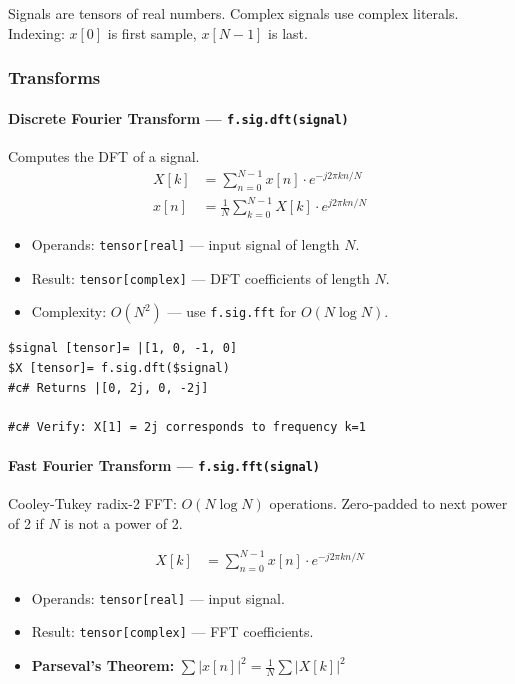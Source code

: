 Signals are tensors of real numbers. Complex signals use complex literals. Indexing: $x[0]$ is first sample, $x[N{-}1]$ is last.

\subsubsection{Transforms}

\paragraph{Discrete Fourier Transform --- \texttt{f.sig.dft(signal)}}
Computes the DFT of a signal.
\begin{align}
X[k] &= \sum_{n=0}^{N-1} x[n] \cdot e^{-j 2\pi k n / N} \label{eq:sig-dft} \\
x[n] &= \frac{1}{N} \sum_{k=0}^{N-1} X[k] \cdot e^{j 2\pi k n / N} \label{eq:sig-idft}
\end{align}

\begin{itemize}
\item Operands: \texttt{tensor[real]} --- input signal of length $N$.
\item Result: \texttt{tensor[complex]} --- DFT coefficients of length $N$.
\item Complexity: $O(N^2)$ --- use \texttt{f.sig.fft} for $O(N \log N)$.
\end{itemize}

\begin{verbatim}
$signal [tensor]= |[1, 0, -1, 0]
$X [tensor]= f.sig.dft($signal)
#c# Returns |[0, 2j, 0, -2j]

#c# Verify: X[1] = 2j corresponds to frequency k=1
\end{verbatim}

\paragraph{Fast Fourier Transform --- \texttt{f.sig.fft(signal)}}
Cooley-Tukey radix-2 FFT: $O(N \log N)$ operations. Zero-padded to next power of 2 if $N$ is not a power of 2.

\begin{align}
X[k] &= \sum_{n=0}^{N-1} x[n] \cdot e^{-j 2\pi k n / N} \label{eq:sig-fft}
\end{align}

\begin{itemize}
\item Operands: \texttt{tensor[real]} --- input signal.
\item Result: \texttt{tensor[complex]} --- FFT coefficients.
\item \textbf{Parseval's Theorem:} $\sum |x[n]|^2 = \frac{1}{N} \sum |X[k]|^2$
\end{itemize}

